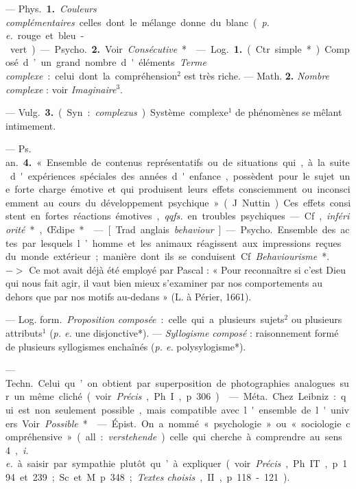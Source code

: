 \begin{itemize}[leftmargin=1cm, label=, itemsep=11pt]
 — \si{Phys.} {\bf 1.} {\it Couleurs
complémentaires} celles dont le
mélange donne du blanc ({\it p. e.} rouge
et bleu-vert).

— \si{Psycho.} {\bf 2.} Voir {\it Consécutive}*.

 — \si{Log.} {\bf 1.} (Ctr.
simple*). Composé d’un grand nombre d'éléments. {\it Terme complexe} :
celui dont la compréhension$^2$ est
très riche. — Math. {\bf 2.} {\it Nombre complexe} : voir {\it Imaginaire}$^3$.

 — \si{Vulg.} {\bf 3.} (Syn. :
{\it complexus}). Système complexe$^1$ de
phénomènes se mêlant intimement.

— \si{Ps. an.} {\bf 4.} « Ensemble de contenus représentatifs ou de situations qui, à la suite d'expériences
spéciales des années d'enfance, possèdent pour le sujet une forte charge
émotive et qui produisent leurs
effets consciemment ou inconsciemment au cours du développement
psychique » (J. Nuttin). Ces effets
consistent en fortes réactions émotives, {\it qqfs.} en troubles psychiques.
— Cf, {\it infériorité}*, Œdipe*.

 — [Trad. anglais {\it behaviour}] — \si{Psycho.} Ensemble des
actes par lesquels l’homme et les
animaux réagissent aux impressions
reçues du monde extérieur; manière
dont ils se conduisent. Cf. {\it Behaviourisme}*. $->$ Ce mot avait déjà
été employé par Pascal : « Pour
reconnaître si c'est Dieu qui nous
fait agir, il vaut bien mieux s’examiner par nos comportements au
dehors que par nos motifs au-dedans »
(L. à Périer, 1661).

 — \si{Log. form.} {\it Proposition
composée} : celle qui a plusieurs
sujets$^2$ ou plusieurs attributs$^1$ ({\it p. e.}
une disjonctive*). — {\it Syllogisme
composé} : raisonnement formé de
plusieurs syllogismes enchaînés ({\it p. e.}
polysylogisme*).

 — \si{Techn.} Celui
qu’on obtient par superposition
de photographies analogues sur
un même cliché (voir {\it Précis}, Ph. I,
p. 306).

 — \si{Méta.} Chez Leibniz :
qui est non seulement possible,
mais compatible avec l'ensemble de
l'univers. Voir {\it Possible}*.

 — \si{Épist.} On a nommé
« psychologie » ou « sociologie compréhensive » (all. : {\it verstehende}) celle
qui cherche à comprendre au sens 4,
{\it i. e.} à saisir par sympathie plutôt
qu’à expliquer (voir {\it Précis}, Ph. IT,
p. 194 et 239; Sc. et M. p. 348;
{\it Textes choisis}, II, p. 118-121).


\end{itemize}
